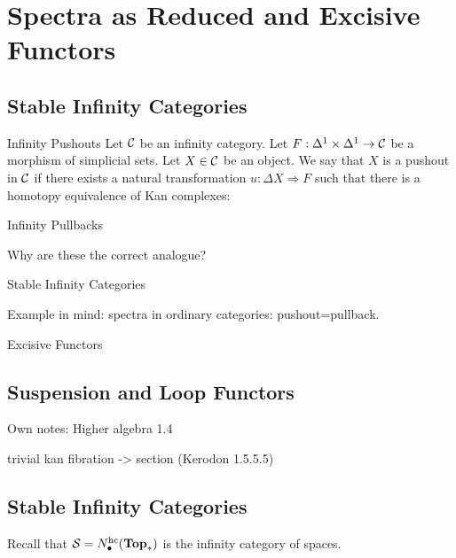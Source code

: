 \documentclass[a4paper]{article}
\begin{document}
\pagebreak
\section{Spectra as Reduced and Excisive Functors}
\subsection{Stable Infinity Categories}
\begin{defn}{Infinity Pushouts}{} Let $\mathcal{C}$ be an infinity category. Let $F:\Delta^1\times\Delta^1\to\mathcal{C}$ be a morphism of simplicial sets. Let $X\in\mathcal{C}$ be an object. We say that $X$ is a pushout in $\mathcal{C}$ if there exists a natural transformation $u:\Delta X\Rightarrow F$ such that there is a homotopy equivalence of Kan complexes: 
\end{defn}

\begin{defn}{Infinity Pullbacks}{}
\end{defn}

Why are these the correct analogue? 

\begin{defn}{Stable Infinity Categories}{}
\end{defn}

Example in mind: spectra in ordinary categories: pushout=pullback. 

\begin{defn}{Excisive Functors}{}
\end{defn}

\subsection{Suspension and Loop Functors}
Own notes: Higher algebra 1.4

trivial kan fibration -> section (Kerodon 1.5.5.5)

\subsection{Stable Infinity Categories}

Recall that $\mathcal{S}=N_\bullet^{\text{hc}}(\bold{Top}_\ast)$ is the infinity category of spaces. 
\end{document}
